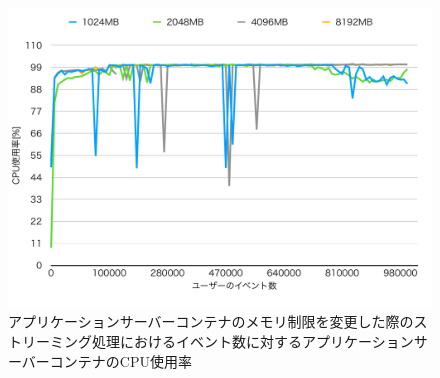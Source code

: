 \documentclass[../../../../../main]{subfiles}
\begin{document}
    \begin{figure}[H]
        \centering
        \includegraphics[width=12cm]{graph}
        \caption{アプリケーションサーバーコンテナのメモリ制限を変更した際のストリーミング処理におけるイベント数に対するアプリケーションサーバーコンテナのCPU使用率}
        \label{fig:stream-change-app-memory-limit-app-cpu-app_4_db_1_1024}
    \end{figure}
\end{document}
